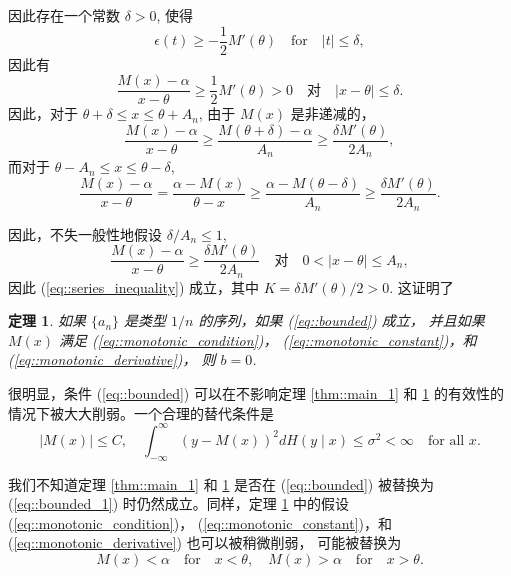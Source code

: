 \documentclass{article}
\newtheorem{theorem}{定理}
\begin{document}
因此存在一个常数 $\delta > 0$, 使得
\begin{equation}
    \epsilon(t) \geq -\frac{1}{2} M'(\theta) \quad \text{for} \quad |t| \leq \delta,
\end{equation}
因此有
\begin{equation}
    \frac{M(x) - \alpha}{x - \theta} \geq \frac{1}{2} M'(\theta) > 0 
    \quad \text{对} \quad |x - \theta| \leq \delta.
\end{equation}
因此，对于 $\theta + \delta \leq x \leq \theta + A_n$, 由于 $M(x)$ 是非递减的，
\begin{equation}
    \frac{M(x) - \alpha}{x - \theta} \geq \frac{M(\theta + \delta) - \alpha}{A_n} \geq \frac{\delta M'(\theta)}{2 A_n},
\end{equation}
而对于 $\theta - A_n \leq x \leq \theta - \delta$,
\begin{equation}
    \frac{M(x) - \alpha}{x - \theta} 
    = \frac{\alpha - M(x)}{\theta - x} 
    \geq \frac{\alpha - M(\theta - \delta)}{A_n} 
    \geq \frac{\delta M'(\theta)}{2 A_n}.
\end{equation}

因此，不失一般性地假设 $\delta / A_n \leq 1$,
\begin{equation}
    \frac{M(x) - \alpha}{x - \theta} \geq \frac{\delta M'(\theta)}{2 A_n} 
    \quad \text{对} \quad 0 < |x - \theta| \leq A_n,
\end{equation}
因此 (\ref{eq::series_inequality}) 成立，其中 $K = \delta M'(\theta) / 2 > 0$. 
这证明了

\begin{theorem}
    \label{thm::main_2}
如果 $\{a_n\}$ 是类型 $1/n$ 的序列，如果 (\ref{eq::bounded}) 成立，
并且如果 $M(x)$ 满足 (\ref{eq::monotonic_condition})，
(\ref{eq::monotonic_constant})，和 (\ref{eq::monotonic_derivative})，
则 $b = 0$.    
\end{theorem}
很明显，条件 (\ref{eq::bounded}) 可以在不影响定理 \ref{thm::main_1} 和 \ref{thm::main_2} 
的有效性的情况下被大大削弱。一个合理的替代条件是
\begin{equation}
    \label{eq::bounded_1}
    |M(x)| \leq C, \quad \int_{-\infty}^{\infty} (y - M(x))^2 dH(y \mid x) 
    \leq \sigma^2 < \infty \quad \text{for all } x. \tag{4'}
\end{equation}

我们不知道定理 \ref{thm::main_1} 和 \ref{thm::main_2} 是否在 (\ref{eq::bounded}) 
被替换为 (\ref{eq::bounded_1}) 时仍然成立。同样，定理 \ref{thm::main_2} 中的假设
(\ref{eq::monotonic_condition})，
(\ref{eq::monotonic_constant})，和 (\ref{eq::monotonic_derivative}) 也可以被稍微削弱，
可能被替换为
\begin{equation}
    M(x) < \alpha \quad \text{for} \quad x < \theta, 
    \quad M(x) > \alpha \quad \text{for} \quad x > \theta. \tag{5''}
\end{equation}
\end{document}

